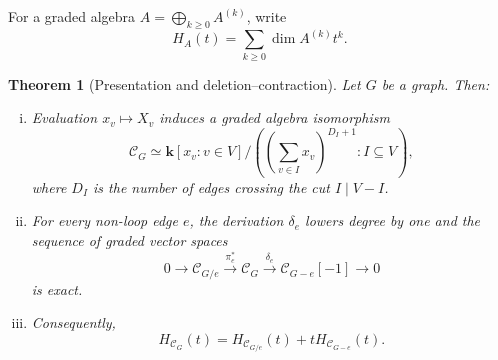 \documentclass[reqno]{article}
\theoremstyle{plain} %
\newtheorem{theorem}{Theorem}[section]
\theoremstyle{definition}
\theoremstyle{remark}
\newcommand{\K} {\mathbf{k}}
\newcommand {\CC}{\mathscr{C}}
\numberwithin{equation}{section}
\begin{document}
For a graded algebra $A=\bigoplus_{k\ge0}A^{(k)}$, write
\begin{equation}\label{eq:hilbert}
H_A(t)=\sum_{k\ge0}\dim A^{(k)}t^k.
\end{equation}

\begin{theorem}[Presentation and deletion--contraction]
\label{th:graded-exact}
Let $G$ be a graph. Then:
\begin{enumerate}[(i)]
\item Evaluation $x_v\mapsto X_v$ induces a graded algebra isomorphism
\begin{equation}\label{eq:relF}
\CC_G\simeq \K[x_v:v\in V]/
\left(\left(\sum_{v\in I}x_v\right)^{D_I+1}:I\subseteq V\right),
\end{equation}
where $D_I$ is the number of edges crossing the cut $I\mid V-I$.
\item For every non-loop edge $e$, the derivation $\delta_e$ lowers degree
by one and the sequence of graded vector spaces
\begin{equation}\label{eq:exact}
0\longrightarrow\CC_{G/e}\xrightarrow{\pi_e^*}\CC_G
\xrightarrow{\delta_e}\CC_{G-e}[-1]\longrightarrow0
\end{equation}
is exact.
\item Consequently,
\begin{equation}\label{eq:Tutte}
H_{\CC_G}(t)=H_{\CC_{G/e}}(t)+tH_{\CC_{G-e}}(t).
\end{equation}
\end{enumerate}
\end{theorem}
\end{document}

